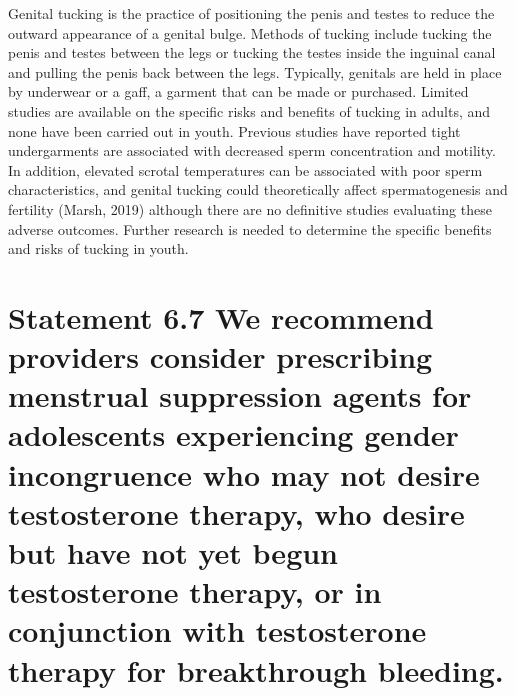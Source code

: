 \documentclass[
]{book}
\begin{document}
Genital tucking is the practice of positioning
the penis and testes to reduce the outward
appearance of a genital bulge. Methods of tucking
include tucking the penis and testes between the
legs or tucking the testes inside the inguinal canal
and pulling the penis back between the legs.
Typically, genitals are held in place by underwear
or a gaff, a garment that can be made or purchased. Limited studies are available on the specific risks and benefits of tucking in adults, and
none have been carried out in youth. Previous
studies have reported tight undergarments are
associated with decreased sperm concentration
and motility. In addition, elevated scrotal temperatures can be associated with poor sperm
characteristics, and genital tucking could theoretically affect spermatogenesis and fertility
(Marsh, 2019) although there are no definitive
studies evaluating these adverse outcomes. Further
research is needed to determine the specific benefits and risks of tucking in youth.

\hypertarget{statement-6.7-we-recommend-providers-consider-prescribing-menstrual-suppression-agents-for-adolescents-experiencing-gender-incongruence-who-may-not-desire-testosterone-therapy-who-desire-but-have-not-yet-begun-testosterone-therapy-or-in-conjunction-with-testosterone-therapy-for-breakthrough-bleeding.}{%
\section*{Statement 6.7 We recommend providers consider prescribing menstrual suppression agents for adolescents experiencing gender incongruence who may not desire testosterone therapy, who desire but have not yet begun testosterone therapy, or in conjunction with testosterone therapy for breakthrough bleeding.}\label{statement-6.7-we-recommend-providers-consider-prescribing-menstrual-suppression-agents-for-adolescents-experiencing-gender-incongruence-who-may-not-desire-testosterone-therapy-who-desire-but-have-not-yet-begun-testosterone-therapy-or-in-conjunction-with-testosterone-therapy-for-breakthrough-bleeding.}}
\end{document}
